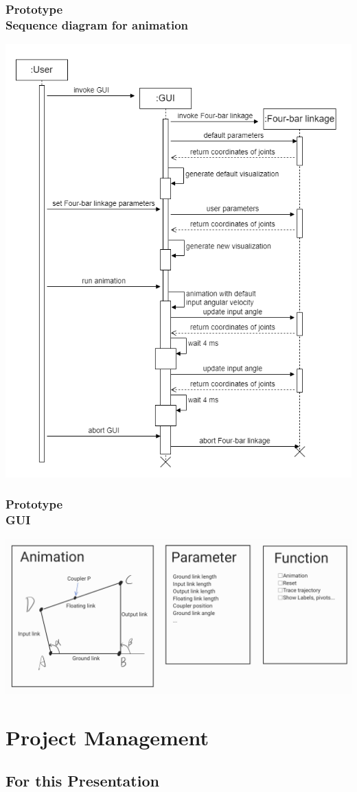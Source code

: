 \documentclass[ucs,10pt]{beamer}
\begin{document}
\begin{frame}
\frametitle{Prototype \\
    \small \color{rwth-blue} Sequence diagram for animation}
    \begin{center}
        \includegraphics[width=0.5\linewidth]{Used_Picture/sequence_diagramm_animation.png}
    \end{center}
\end{frame}

\begin{frame}
\frametitle{Prototype \\
    \small \color{rwth-blue} GUI}
    \begin{center}
        \includegraphics[width=1\linewidth]{Used_Picture/Prototype_1.jpg}
    \end{center}
\end{frame}


\section{Project Management}


\subsection{For this Presentation}
\end{document}

